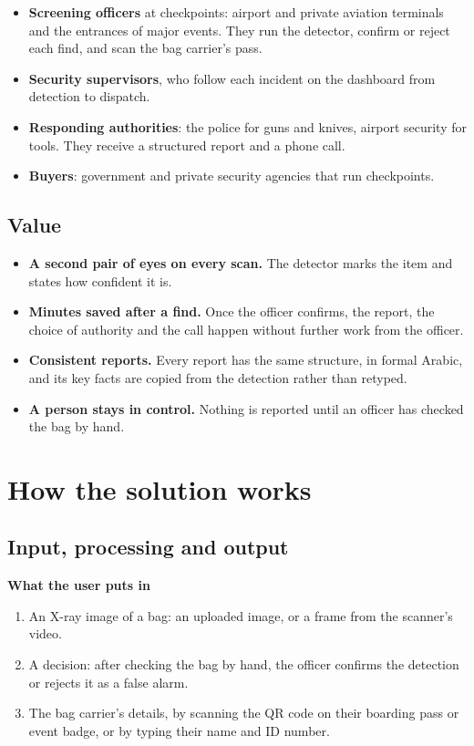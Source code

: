 \documentclass[11pt,a4paper]{article}
\begin{document}
\begin{itemize}
  \item \textbf{Screening officers} at checkpoints: airport and private aviation terminals and the
        entrances of major events. They run the detector, confirm or reject each find, and scan the
        bag carrier's pass.
  \item \textbf{Security supervisors}, who follow each incident on the dashboard from detection to
        dispatch.
  \item \textbf{Responding authorities}: the police for guns and knives, airport security for tools.
        They receive a structured report and a phone call.
  \item \textbf{Buyers}: government and private security agencies that run checkpoints.
\end{itemize}

\subsection{Value}

\begin{itemize}
  \item \textbf{A second pair of eyes on every scan.} The detector marks the item and states how
        confident it is.
  \item \textbf{Minutes saved after a find.} Once the officer confirms, the report, the choice of
        authority and the call happen without further work from the officer.
  \item \textbf{Consistent reports.} Every report has the same structure, in formal Arabic, and its
        key facts are copied from the detection rather than retyped.
  \item \textbf{A person stays in control.} Nothing is reported until an officer has checked the bag
        by hand.
\end{itemize}

\section{How the solution works}
\label{sec:flow}

\subsection{Input, processing and output}

\textbf{What the user puts in}
\begin{enumerate}
  \item An X-ray image of a bag: an uploaded image, or a frame from the scanner's video.
  \item A decision: after checking the bag by hand, the officer confirms the detection or rejects it
        as a false alarm.
  \item The bag carrier's details, by scanning the QR code on their boarding pass or event badge,
        or by typing their name and ID number.
\end{enumerate}
\end{document}

